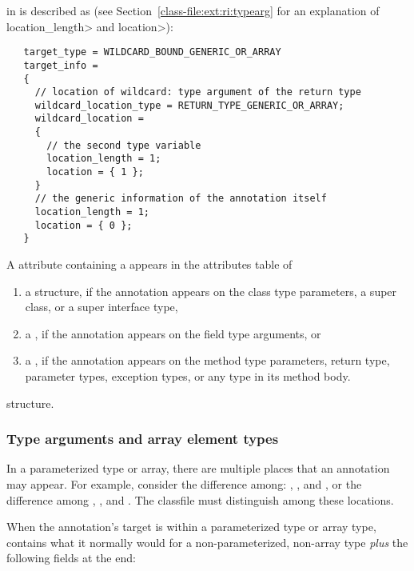 \documentclass[10pt]{article}
\begin{document}
\noindent
{} in  is described as (see Section~\ref{class-file:ext:ri:typearg} for
an explanation of \<location\_length> and \<location>):

\begin{Verbatim}
   target_type = WILDCARD_BOUND_GENERIC_OR_ARRAY
   target_info =
   {
     // location of wildcard: type argument of the return type
     wildcard_location_type = RETURN_TYPE_GENERIC_OR_ARRAY;
     wildcard_location =
     {
       // the second type variable
       location_length = 1;
       location = { 1 };
     }
     // the generic information of the annotation itself
     location_length = 1;
     location = { 0 };
   }
\end{Verbatim}

A \RuntimeInOrVisibleTypeAnnotations attribute containing a
 appears in the attributes table of

\begin{enumerate}
\item
a  structure, if the annotation appears on the class
type parameters, a super class, or a super interface type,

\item
a , if the annotation appears on the field type
arguments, or

\item
a , if the annotation appears on the method type
parameters, return type, parameter types, exception types, or any type
in its method body.

\end{enumerate}

 structure.

\subsubsection{Type arguments and array element types\label{class-file:ext:ri:typearg}}

In a parameterized type or array, there are multiple places that an
annotation may appear.  For example, consider the difference among:
,
, and
,
or the difference  among 
,
, and
.
The classfile must distinguish among these locations.

When the annotation's target is within a parameterized type or
array type,
 contains what it normally would for a
non-parameterized, non-array type
{\em plus} the following fields at the end:
\end{document}
